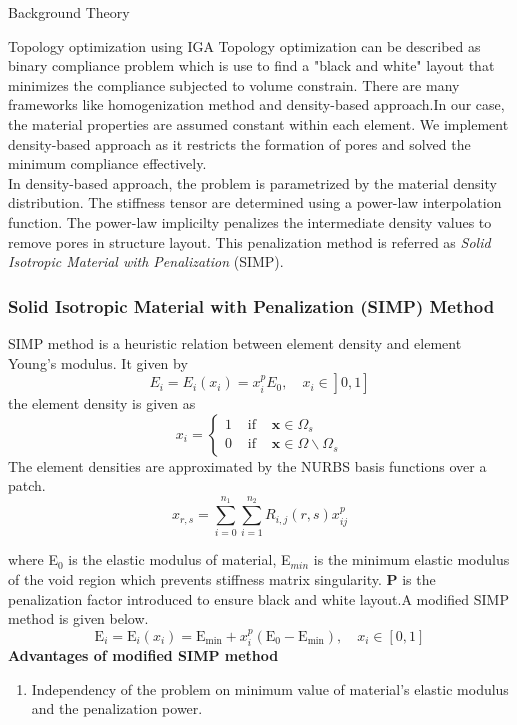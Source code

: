 \documentclass[a4paper,12pt,times]{article}
\begin{document}
\begin{section}{Background Theory}
\begin{subsection}{Topology optimization using IGA}
Topology optimization can be described as binary compliance problem which is use to find a "black and white" layout that minimizes the compliance subjected to volume constrain. There are many frameworks like homogenization method and density-based approach.In our case, the material properties are assumed constant within each element. We implement density-based approach as it restricts the formation of pores and solved the minimum compliance effectively.\\
In density-based approach, the problem is parametrized by the material density distribution. The stiffness tensor are determined using a power-law interpolation function. The power-law implicilty penalizes the intermediate density values to remove pores in structure layout. This penalization method is referred as \textit{Solid Isotropic Material with Penalization} (SIMP). 

\subsubsection{Solid Isotropic Material with Penalization (SIMP) Method}
SIMP method is a heuristic relation
between element density  and element Young’s modulus. It given by 
\begin{equation}
\left.\left.E_{i}=E_{i}\left(x_{i}\right)=x_{i}^{p} E_{0}, \quad x_{i} \in\right] 0,1\right]
\end{equation}
the element density is given as
\begin{equation}
x_i=\left\{\begin{array}{lll}
1 & \text { if } & \mathbf{x} \in \Omega_{s} \\
0 & \text { if } & \mathbf{x} \in \Omega \backslash \Omega_{s}
\end{array}\right.
\end{equation}
The element densities are approximated by the NURBS basis functions over a patch.
\begin{equation}
x_{r, s}=\sum_{i=0}^{n_{1}} \sum_{i=1}^{n_{2}} R_{i, j}(r, s) x^{p}_{i j}
\end{equation}

where E$_0$ is the elastic modulus of material, E$_{min}$ is the minimum elastic modulus of the void region which prevents stiffness matrix singularity. \textbf{P} is the penalization factor introduced to ensure black and white layout.A modified SIMP method is given below.
\begin{equation}
\mathrm{E}_{i}=\mathrm{E}_{i}\left(x_{i}\right)=\mathrm{E}_{\min }+x_{i}^{p}\left(\mathrm{E}_{0}-\mathrm{E}_{\min }\right), \quad x_{i} \in[0,1]
\end{equation}
\textbf{Advantages of modified SIMP method}
\begin{enumerate}
\item Independency of the problem on minimum value of material's elastic modulus and the penalization power.
\end{enumerate}


\end{subsection}
\end{section}
\end{document}
